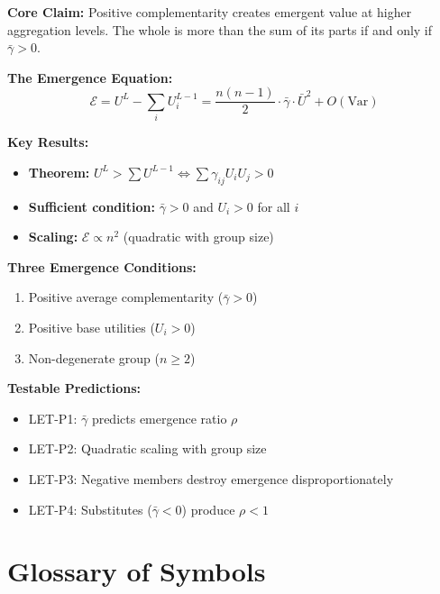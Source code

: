 \begin{tcolorbox}[colback=green!10!white, colframe=green!75!black,
    title=\textbf{Appendix IV Summary: The Level Emergence Theorem}]

\textbf{Core Claim:}
Positive complementarity creates emergent value at higher aggregation levels.
The whole is more than the sum of its parts if and only if $\bar{\gamma} > 0$.

\textbf{The Emergence Equation:}
\begin{equation*}
\mathcal{E} = U^L - \sum_i U^{L-1}_i = \frac{n(n-1)}{2} \cdot \bar{\gamma} \cdot \bar{U}^2 + O(\text{Var})
\end{equation*}

\textbf{Key Results:}
\begin{itemize}[nosep]
\item \textbf{Theorem:} $U^L > \sum U^{L-1} \Leftrightarrow \sum \gamma_{ij} U_i U_j > 0$
\item \textbf{Sufficient condition:} $\bar{\gamma} > 0$ and $U_i > 0$ for all $i$
\item \textbf{Scaling:} $\mathcal{E} \propto n^2$ (quadratic with group size)
\end{itemize}

\textbf{Three Emergence Conditions:}
\begin{enumerate}[nosep]
\item Positive average complementarity ($\bar{\gamma} > 0$)
\item Positive base utilities ($U_i > 0$)
\item Non-degenerate group ($n \geq 2$)
\end{enumerate}

\textbf{Testable Predictions:}
\begin{itemize}[nosep]
\item LET-P1: $\bar{\gamma}$ predicts emergence ratio $\rho$
\item LET-P2: Quadratic scaling with group size
\item LET-P3: Negative members destroy emergence disproportionately
\item LET-P4: Substitutes ($\bar{\gamma} < 0$) produce $\rho < 1$
\end{itemize}

\end{tcolorbox}


\section{Glossary of Symbols}
\label{sec:let-glossary}

